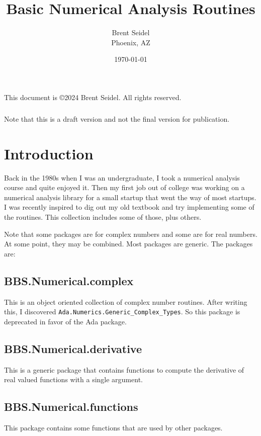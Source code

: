 \documentclass[10pt, openany]{book}
\title{Basic Numerical Analysis Routines}
\author{Brent Seidel \\ Phoenix, AZ}
\date{ \today }
\newcommand{\package}[1]{\texttt{#1}}
\begin{document}
%
%
\frontmatter
\maketitle
\begin{center}
This document is \copyright 2024 Brent Seidel.  All rights reserved.

\paragraph{}Note that this is a draft version and not the final version for publication.
\end{center}
\tableofcontents

\mainmatter
\chapter{Introduction}

Back in the 1980s when I was an undergraduate, I took a numerical analysis course and quite enjoyed it.  Then my first job out of college was working on a numerical analysis library for a small startup that went the way of most startups.  I was recently inspired to dig out my old textbook and try implementing some of the routines.  This collection includes some of those, plus others.

Note that some packages are for complex numbers and some are for real numbers.  At some point, they may be combined.  Most packages are generic.  The packages are:

\section{BBS.Numerical.complex}
This is an object oriented collection of complex number routines.  After writing this, I discovered \package{Ada.Numerics.Generic\_Complex\_Types}.  So this package is deprecated in favor of the Ada package.

\section{BBS.Numerical.derivative}
This is a generic package that contains functions to compute the derivative of real valued functions with a single argument.

\section{BBS.Numerical.functions}
This package contains some functions that are used by other packages.
\end{document}
